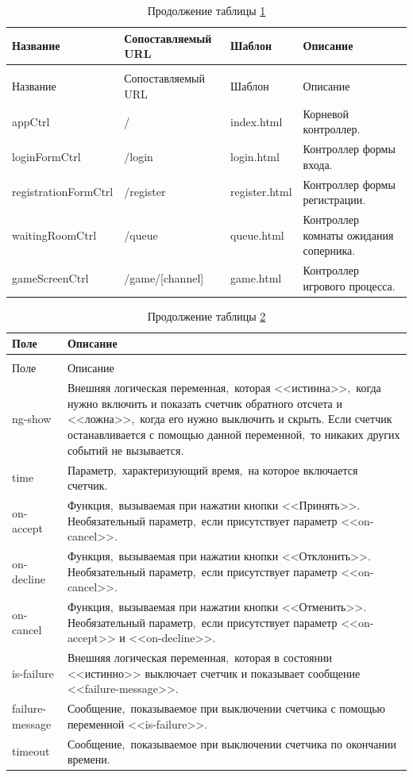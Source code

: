 \documentclass[14pt,a4paper]{report}
\begin{document}
\begin{longtable}{| l | p{3.7cm} | l | p{5cm} |}
\caption{Контролеры}
\label{tab:controllers}\\*\hline
Название & Сопоставляемый URL & Шаблон & Описание\\*\hline
\endfirsthead
\caption*{Продолжение таблицы \ref{tab:controllers}}\\*\hline
Название & Сопоставляемый URL & Шаблон & Описание\\*\hline
\endhead
appCtrl & / & index.html & Корневой контроллер.\\*\hline
loginFormCtrl & /login & login.html & Контроллер формы входа.\\*\hline
registrationFormCtrl & /register & register.html & Контроллер формы регистрации.\\*\hline
waitingRoomCtrl & /queue & queue.html & Контроллер комнаты ожидания соперника.\\*\hline
gameScreenCtrl & /game/[channel] & game.html & Контроллер игрового процесса.\\*\hline
\end{longtable}

\begin{longtable}{| l | p{13cm} |}
\caption{Параметры к директиве обратного отсчета}
\label{tab:countdown_struct}\\*\hline
Поле & Описание\\*\hline
\endfirsthead
\caption*{Продолжение таблицы \ref{tab:countdown_struct}}\\*\hline
Поле & Описание\\*\hline
\endhead
ng-show & Внешняя логическая переменная,~которая <<истинна>>,~когда нужно включить и показать счетчик обратного отсчета и <<ложна>>,~когда его нужно выключить и скрыть. Если счетчик останавливается с помощью данной переменной,~то никаких других событий не вызывается.\\*\hline
time & Параметр,~характеризующий время,~на которое включается счетчик.\\*\hline
on-accept & Функция,~вызываемая при нажатии кнопки <<Принять>>. Необязательный параметр,~если присутствует параметр <<on-cancel>>.\\*\hline
on-decline & Функция,~вызываемая при нажатии кнопки <<Отклонить>>. Необязательный параметр,~если присутствует параметр <<on-cancel>>.\\*\hline
on-cancel & Функция,~вызываемая при нажатии кнопки <<Отменить>>. Необязательный параметр,~если присутствует параметр <<on-accept>> и <<on-decline>>.\\*\hline
is-failure & Внешняя логическая переменная,~которая в состоянии <<истинно>> выключает счетчик и показывает сообщение <<failure-message>>.\\*\hline
failure-message & Сообщение,~показываемое при выключении счетчика с помощью переменной <<is-failure>>.\\*\hline
timeout & Сообщение,~показываемое при выключении счетчика по окончании времени.\\*\hline
\end{longtable}
\end{document}
